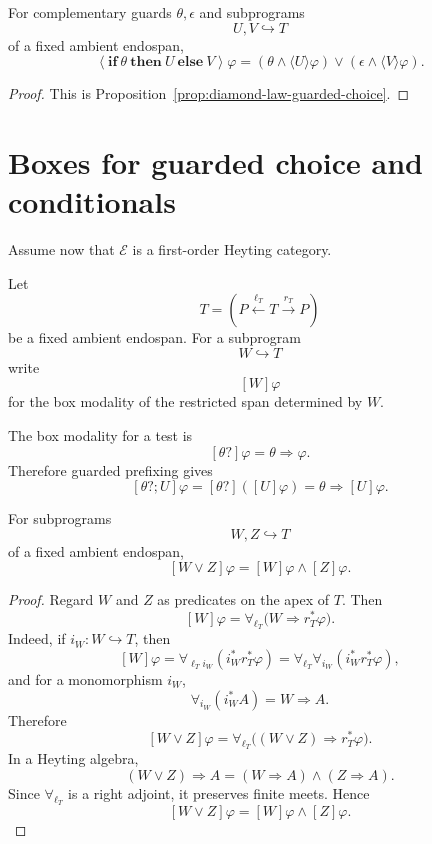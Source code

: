 \begin{corollary}
\label{cor:conditional-diamond-law}
For complementary guards \(\theta,\epsilon\) and subprograms
\[
U,V\hookrightarrow T
\]
of a fixed ambient endospan,
\[
\left\langle
\mathbf{if}\ \theta\ \mathbf{then}\ U\ \mathbf{else}\ V
\right\rangle\varphi
=
(\theta\wedge\langle U\rangle\varphi)
\vee
(\epsilon\wedge\langle V\rangle\varphi).
\]
\end{corollary}

\begin{proof}
This is Proposition~\ref{prop:diamond-law-guarded-choice}.
\end{proof}

\section{Boxes for guarded choice and conditionals}
\label{sec:boxes-guarded-choice-conditionals}

Assume now that \(\mathcal E\) is a first-order Heyting category.

Let
\[
T=
\left(
P\xleftarrow{\ell_T}T\xrightarrow{r_T}P
\right)
\]
be a fixed ambient endospan. For a subprogram
\[
W\hookrightarrow T
\]
write
\[
[W]\varphi
\]
for the box modality of the restricted span determined by \(W\).

The box modality for a test is
\[
[\theta?]\varphi=\theta\Rightarrow\varphi.
\]
Therefore guarded prefixing gives
\[
[\theta?;U]\varphi
=
[\theta?]([U]\varphi)
=
\theta\Rightarrow[U]\varphi.
\]

\begin{proposition}
\label{prop:box-finite-subprogram-choice}
For subprograms
\[
W,Z\hookrightarrow T
\]
of a fixed ambient endospan,
\[
[W\vee Z]\varphi
=
[W]\varphi\wedge[Z]\varphi.
\]
\end{proposition}

\begin{proof}
Regard \(W\) and \(Z\) as predicates on the apex of \(T\). Then
\[
[W]\varphi
=
\forall_{\ell_T}\bigl(W\Rightarrow r_T^\ast\varphi\bigr).
\]
Indeed, if \(i_W:W\hookrightarrow T\), then
\[
[W]\varphi
=
\forall_{\ell_T i_W}(i_W^\ast r_T^\ast\varphi)
=
\forall_{\ell_T}\forall_{i_W}(i_W^\ast r_T^\ast\varphi),
\]
and for a monomorphism \(i_W\),
\[
\forall_{i_W}(i_W^\ast A)=W\Rightarrow A.
\]
Therefore
\[
[W\vee Z]\varphi
=
\forall_{\ell_T}\bigl((W\vee Z)\Rightarrow r_T^\ast\varphi\bigr).
\]
In a Heyting algebra,
\[
(W\vee Z)\Rightarrow A
=
(W\Rightarrow A)\wedge(Z\Rightarrow A).
\]
Since \(\forall_{\ell_T}\) is a right adjoint, it preserves finite meets.
Hence
\[
[W\vee Z]\varphi
=
[W]\varphi\wedge[Z]\varphi.
\]
\end{proof}

